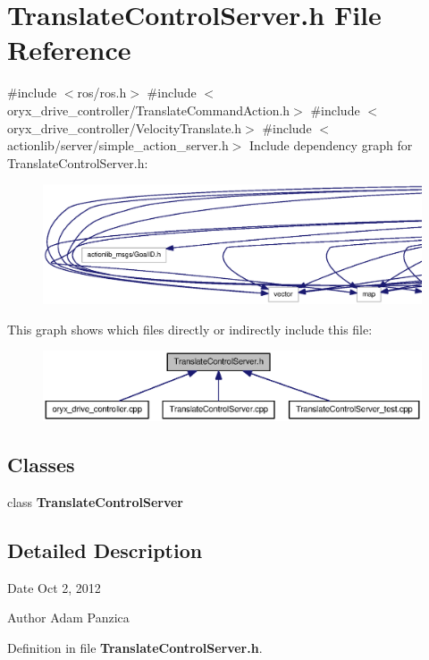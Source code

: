 \section{\-Translate\-Control\-Server.\-h \-File \-Reference}
\label{TranslateControlServer_8h}
{\ttfamily \#include $<$ros/ros.\-h$>$}\*
{\ttfamily \#include $<$oryx\-\_\-drive\-\_\-controller/\-Translate\-Command\-Action.\-h$>$}\*
{\ttfamily \#include $<$oryx\-\_\-drive\-\_\-controller/\-Velocity\-Translate.\-h$>$}\*
{\ttfamily \#include $<$actionlib/server/simple\-\_\-action\-\_\-server.\-h$>$}\*
\-Include dependency graph for \-Translate\-Control\-Server.\-h\-:
\nopagebreak
\begin{figure}[H]
\begin{center}
\leavevmode
\includegraphics[width=350pt]{TranslateControlServer_8h__incl}
\end{center}
\end{figure}
\-This graph shows which files directly or indirectly include this file\-:
\nopagebreak
\begin{figure}[H]
\begin{center}
\leavevmode
\includegraphics[width=350pt]{TranslateControlServer_8h__dep__incl}
\end{center}
\end{figure}
\subsection*{\-Classes}
\begin{DoxyCompactItemize}
\item 
class {\bf \-Translate\-Control\-Server}
\end{DoxyCompactItemize}


\subsection{\-Detailed \-Description}
\begin{DoxyDate}{\-Date}
\-Oct 2, 2012 
\end{DoxyDate}
\begin{DoxyAuthor}{\-Author}
\-Adam \-Panzica 
\end{DoxyAuthor}


\-Definition in file {\bf \-Translate\-Control\-Server.\-h}.


